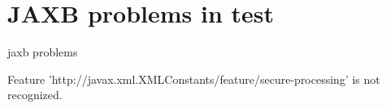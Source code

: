 \documentclass[a4paper,10pt]{article}
\date{10/25/16}
\begin{document}
\section{JAXB problems in test}
   jaxb problems
   
   Feature 'http://javax.xml.XMLConstants/feature/secure-processing' is not recognized.
\end{document}
